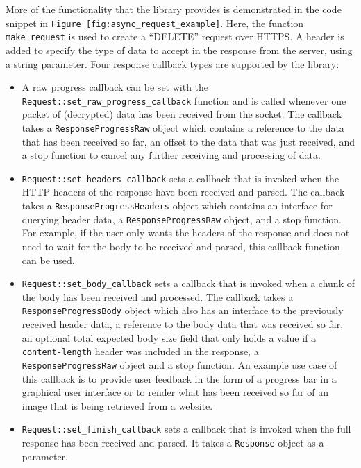 \documentclass[12pt, a4paper]{article}
\begin{document}
More of the functionality that the library provides is demonstrated in the code snippet in \texttt{Figure \ref{fig:async_request_example}}. Here, the function \texttt{make\_request} is used to create a “DELETE” request over HTTPS. A header is added to specify the type of data to accept in the response from the server, using a string parameter. Four response callback types are supported by the library:
\begin{itemize}
	\item A raw progress callback can be set with the \texttt{Request::set\_raw\_progress\_callback} function and is called whenever one packet of (decrypted) data has been received from the socket. The callback takes a \texttt{ResponseProgressRaw} object which contains a reference to the data that has been received so far, an offset to the data that was just received, and a stop function to cancel any further receiving and processing of data.
	\item \texttt{Request::set\_headers\_callback} sets a callback that is invoked when the HTTP headers of the response have been received and parsed. The callback takes a \texttt{ResponseProgressHeaders} object which contains an interface for querying header data, a \texttt{ResponseProgressRaw} object, and a stop function. For example, if the user only wants the headers of the response and does not need to wait for the body to be received and parsed, this callback function can be used.
	\item \texttt{Request::set\_body\_callback} sets a callback that is invoked when a chunk of the body has been received and processed. The callback takes a \texttt{ResponseProgressBody} object which also has an interface to the previously received header data, a reference to the body data that was received so far, an optional total expected body size field that only holds a value if a \texttt{content-length} header was included in the response, a \texttt{ResponseProgressRaw} object and a stop function. An example use case of this callback is to provide user feedback in the form of a progress bar in a graphical user interface or to render what has been received so far of an image that is being retrieved from a website.
	\item \texttt{Request::set\_finish\_callback} sets a callback that is invoked when the full response has been received and parsed. It takes a \texttt{Response} object as a parameter.
\end{itemize}
\end{document}
